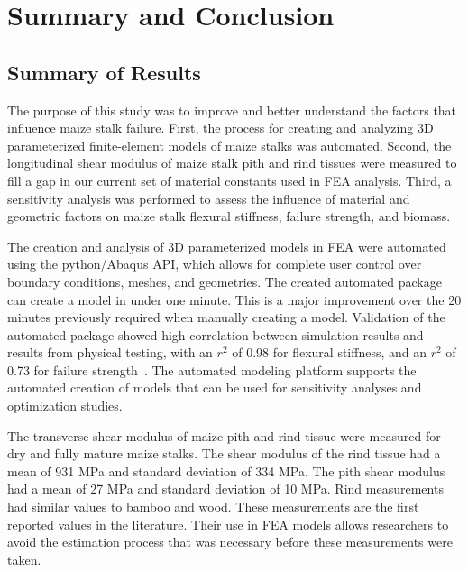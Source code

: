 \chapter{Summary and Conclusion}
\label{ch:ch5}

\section{Summary of Results}
\label{sec:summary_of_results}
The purpose of this study was to improve and better understand the factors that influence maize stalk failure. First, the process for creating and analyzing 3D parameterized finite-element models of maize stalks was automated. Second, the longitudinal shear modulus of maize stalk pith and rind tissues were measured to fill a gap in our current set of material constants used in FEA analysis. Third, a sensitivity analysis was performed to assess the influence of material and geometric factors on maize stalk flexural stiffness, failure strength, and biomass.

The creation and analysis of 3D parameterized models in FEA were automated using the python/Abaqus API, which allows for complete user control over boundary conditions, meshes, and geometries. The created automated package can create a model in under one minute. This is a major improvement over the 20 minutes previously required when manually creating a model. Validation of the automated package showed high correlation between simulation results and results from physical testing, with an ${r^{2}}$ of 0.98 for flexural stiffness, and an ${r^{2}}$ of 0.73 for failure strength~. The automated modeling platform supports the automated creation of models that can be used for sensitivity analyses and optimization studies.

The transverse shear modulus of maize pith and rind tissue were measured for dry and fully mature maize stalks. The shear modulus of the rind tissue had a mean of 931 MPa and standard deviation of 334 MPa. The pith shear modulus had a mean of 27 MPa and standard deviation of 10 MPa. Rind measurements had similar values to bamboo and wood. These measurements are the first reported values in the literature. Their use in FEA models allows researchers to avoid the estimation process that was necessary before these measurements were taken. 

